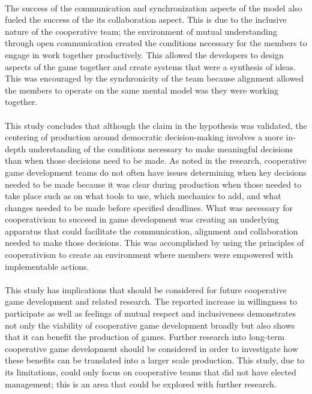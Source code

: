 \paragraph{} The success of the communication and synchronization aspects of the model also fueled the success of the its collaboration aspect. This is due to the inclusive nature of the cooperative team; the environment of mutual understanding through open communication created the conditions necessary for the members to engage in work together productively. This allowed the developers to design aspects of the game together and create systems that were a synthesis of ideas. This was encouraged by the synchronicity of the team because alignment allowed the members to operate on the same mental model was they were working together.

\paragraph{} This study concludes that although the claim in the hypothesis was validated, the centering of production around democratic decision-making involves a more in-depth understanding of the conditions necessary to make meaningful decisions than when those decisions need to be made. As noted in the research, cooperative game development teams do not often have issues determining when key decisions needed to be made because it was clear during production when those needed to take place such as on what tools to use, which mechanics to add, and what changes needed to be made before specified deadlines. What was necessary for cooperativism to succeed in game development was creating an underlying apparatus that could facilitate the communication, alignment and collaboration needed to make those decisions. This was accomplished by using the principles of cooperativism to create an environment where members were empowered with implementable actions.

\paragraph{} This study has implications that should be considered for future cooperative game development and related research. The reported increase in willingness to participate as well as feelings of mutual respect and inclusiveness demonstrates not only the viability of cooperative game development broadly but also shows that it can benefit the production of games. Further research into long-term cooperative game development should be considered in order to investigate how these benefits can be translated into a larger scale production. This study, due to its limitations, could only focus on cooperative teams that did not have elected management; this is an area that could be explored with further research.